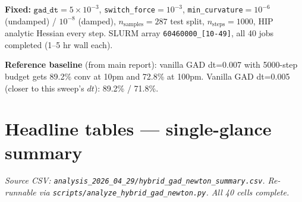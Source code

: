 \documentclass[11pt]{article}
\begin{document}
\textbf{Fixed:} $\mathtt{gad\_dt}{=}5\!\times\!10^{-3}$,
\texttt{switch\_force}${=}10^{-3}$, \texttt{min\_curvature}${=}10^{-6}$
(undamped) / $10^{-8}$ (damped),
$n_{\text{samples}}{=}287$ test split, $n_{\text{steps}}{=}1000$, HIP
analytic Hessian every step. SLURM array \texttt{60460000\_[10-49]},
all 40 jobs completed (1--5 hr wall each).

\textbf{Reference baseline} (from main report): vanilla GAD dt=0.007 with
5000-step budget gets 89.2\% conv at 10pm and 72.8\% at 100pm. Vanilla
GAD dt=0.005 (closer to this sweep's $dt$): 89.2\% / 71.8\%.

\section{Headline tables --- single-glance summary}

\textit{Source CSV: \texttt{analysis\_2026\_04\_29/hybrid\_gad\_newton\_summary.csv}.
Re-runnable via \texttt{scripts/analyze\_hybrid\_gad\_newton.py}. All 40 cells complete.}
\end{document}
